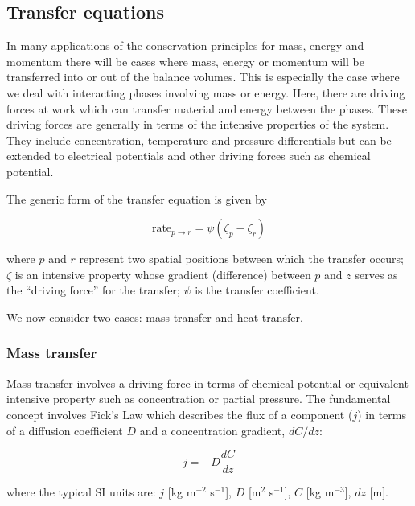 \documentclass[a4paper,11pt]{article}
\theoremstyle{definition}
\begin{document}
\subsection{Transfer equations}

In many applications of the conservation principles for mass, energy and momentum 
there will be cases where mass, energy or momentum will be transferred into or out of
the balance volumes. This is especially the case where we deal with interacting phases
involving mass or energy. Here, there are driving forces at work which can transfer
material and energy between the phases. These driving forces are generally in terms
of the intensive properties of the system. They include concentration, temperature and
pressure differentials but can be extended to electrical potentials and other driving
forces such as chemical potential.

The generic form of the transfer equation is given by

\begin{equation} \label{eq:transfer}
	\textrm{rate}_{p \to r} = \psi ( \zeta_p - \zeta_r )
\end{equation}

\noindent where $p$ and $r$ represent two spatial positions between which the transfer occurs;
$\zeta$ is an intensive property whose gradient (difference) between $p$ and $z$ serves as the ``driving force''
for the transfer; $\psi$ is the transfer coefficient.

We now consider two cases: mass transfer and heat transfer.

\subsubsection*{Mass transfer}

Mass transfer involves a driving force in terms of chemical potential or equivalent
intensive property such as concentration or partial pressure. The fundamental concept
involves Fick's Law which describes the flux of a component ($j$) in terms of a diffusion
coefficient $D$ and a concentration gradient, $d C / d z$:

\begin{equation} \label{eq:fick}
	j = - D \frac{d C}{d z}
\end{equation}

\noindent where the typical SI units are: $j$ [kg m$^{-2}$ s$^{-1}$], $D$ [m$^2$ s$^{-1}$], $C$ [kg m$^{-3}$], $dz$ [m].
\end{document}
